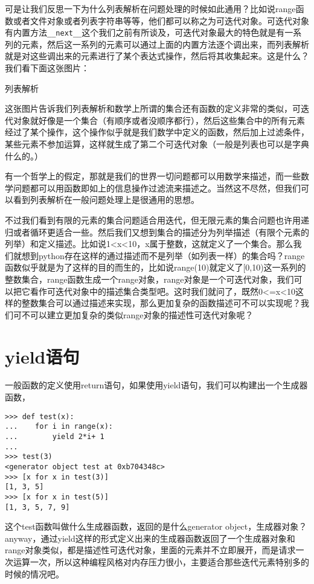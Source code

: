 \documentclass[12pt,oneside]{book}
\begin{document}
\begin{common-format}
可是让我们反思一下为什么列表解析在问题处理的时候如此通用？比如说range函数或者文件对象或者列表字符串等等，他们都可以称之为可迭代对象。可迭代对象有内置方法\verb+__next__+这个我们之前有所谈及，可迭代对象最大的特色就是有一系列的元素，然后这一系列的元素可以通过上面的内置方法逐个调出来，而列表解析就是对这些调出来的元素进行了某个表达式操作，然后将其收集起来。这是什么？我们看下面这张图片：
\begin{fig}{列表解析}
\caption{列表解析}
\label{fig:列表解析}
\end{fig}

这张图片告诉我们列表解析和数学上所谓的集合还有函数的定义非常的类似，可迭代对象就好像是一个集合（有顺序或者没顺序都行），然后这些集合中的所有元素经过了某个操作，这个操作似乎就是我们数学中定义的函数，然后加上过滤条件，某些元素不参加运算，这样就生成了第二个可迭代对象（一般是列表也可以是字典什么的。）

有一个哲学上的假定，那就是我们的世界一切问题都可以用数学来描述，而一些数学问题都可以用函数即如上的信息操作过滤流来描述之。当然这不尽然，但我们可以看到列表解析在一般问题处理上是很通用的思想。

不过我们看到有限的元素的集合问题适合用迭代，但无限元素的集合问题也许用递归或者循环更适合一些。然后我们又想到集合的描述分为列举描述（有限个元素的列举）和定义描述。比如说1<x<10，x属于整数，这就定义了一个集合。那么我们就想到python存在这样的通过描述而不是列举（如列表一样）的集合吗？range函数似乎就是为了这样的目的而生的，比如说range(10)就定义了[0,10)这一系列的整数集合，range函数生成一个range对象，range对象是一个可迭代对象，我们可以把它看作可迭代对象中的描述集合类型吧。这时我们就问了，既然0<=x<10这样的整数集合可以通过描述来实现，那么更加复杂的函数描述可不可以实现呢？我们可不可以建立更加复杂的类似range对象的描述性可迭代对象呢？

\section{yield语句}
一般函数的定义使用return语句，如果使用yield语句，我们可以构建出一个生成器函数，
\begin{Verbatim}
>>> def test(x):
...    for i in range(x):
...        yield 2*i+ 1
... 
>>> test(3)
<generator object test at 0xb704348c>
>>> [x for x in test(3)]
[1, 3, 5]
>>> [x for x in test(5)]
[1, 3, 5, 7, 9]
\end{Verbatim}

这个test函数叫做什么生成器函数，返回的是什么generator object，生成器对象？anyway，通过yield这样的形式定义出来的生成器函数返回了一个生成器对象和range对象类似，都是描述性可迭代对象，里面的元素并不立即展开，而是请求一次运算一次，所以这种编程风格对内存压力很小，主要适合那些迭代元素特别多的时候的情况吧。


\end{common-format}
\end{document}
